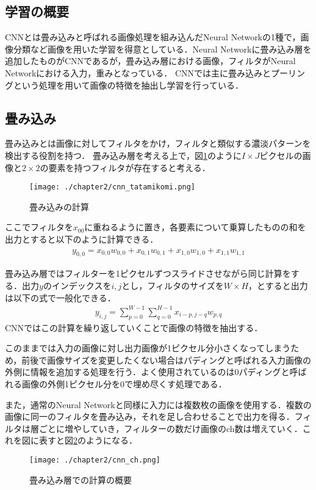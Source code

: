 \subsection{学習の概要}
CNNとは畳み込みと呼ばれる画像処理を組み込んだNeural Networkの1種で，画像分類など画像を用いた学習を得意としている．Neural Networkに畳み込み層を追加したものがCNNであるが，畳み込み層における画像，フィルタがNeural Networkにおける入力，重みとなっている．
CNNでは主に畳み込みとプーリングという処理を用いて画像の特徴を抽出し学習を行っている．


\subsection{畳み込み}
畳み込みとは画像に対してフィルタをかけ，フィルタと類似する濃淡パターンを検出する役割を持つ．
畳み込み層を考える上で，図\ref{fig_conv}のように$I \times J$ピクセルの画像と$2 \times 2$の要素を持つフィルタが存在すると考える．
\begin{figure}[htbp]
  \begin{center}
    \texttt{[image: ./chapter2/cnn\_tatamikomi.png]}
    \caption{畳み込みの計算}
    \label{fig_conv}
  \end{center}
\end{figure}

ここでフィルタを$x_{00}$に重ねるように置き，各要素について乗算したものの和を出力とすると以下のように計算できる．
\begin{align}
  y_{0,0} = x_{0,0}w_{0,0} + x_{0,1}w_{0,1} + x_{1,0}w_{1,0} + x_{1,1}w_{1,1}
  \label{fig_NN1}
\end{align}

畳み込み層ではフィルターを1ピクセルずつスライドさせながら同じ計算をする．出力$y$のインデックスを$i,j$とし，フィルタのサイズを$W\times H$，とすると出力は以下の式で一般化できる．
\begin{align}
  y_{i,j} = \sum^{W-1}_{p=0} \sum^{H-1}_{q=0} x_{i-p,j-q}w_{p,q}
\end{align}
CNNではこの計算を繰り返していくことで画像の特徴を抽出する．

このままでは入力の画像に対し出力画像が1ピクセル分小さくなってしまうため，前後で画像サイズを変更したくない場合はパディングと呼ばれる入力画像の外側に情報を追加する処理を行う．よく使用されているのは0パディングと呼ばれる画像の外側1ピクセル分を0で埋め尽くす処理である．

また，通常のNeural Networkと同様に入力には複数枚の画像を使用する．複数の画像に同一のフィルタを畳み込み，それを足し合わせることで出力を得る．フィルタは層ごとに増やしていき，フィルターの数だけ画像のch数は増えていく．これを図に表すと図\ref{fig_cnn_ch}のようになる．
\begin{figure}[htbp]
  \begin{center}
    \texttt{[image: ./chapter2/cnn\_ch.png]}
    \caption{畳み込み層での計算の概要}
    \label{fig_cnn_ch}
  \end{center}
\end{figure}

